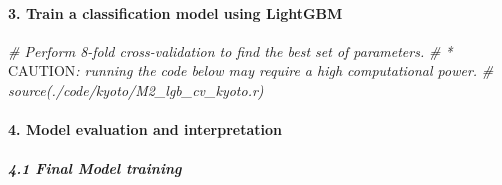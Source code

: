 \documentclass[
]{article}
\newenvironment{Shaded}{\begin{snugshade}}{\end{snugshade}}
\newcommand{\AlertTok}[1]{\textcolor[rgb]{0.94,0.16,0.16}{#1}}
\newcommand{\CommentTok}[1]{\textcolor[rgb]{0.56,0.35,0.01}{\textit{#1}}}
\begin{document}
\hypertarget{train-a-classification-model-using-lightgbm}{%
\paragraph{3. Train a classification model using
LightGBM}\label{train-a-classification-model-using-lightgbm}}

\begin{Shaded}
\begin{Highlighting}[]
\CommentTok{\# Perform 8{-}fold cross{-}validation to find the best set of parameters.}
\CommentTok{\# * }\AlertTok{CAUTION}\CommentTok{: running the code below may require a high computational power.}
\CommentTok{\# source(./code/kyoto/M2\_lgb\_cv\_kyoto.r)}
\end{Highlighting}
\end{Shaded}

\hypertarget{model-evaluation-and-interpretation}{%
\paragraph{4. Model evaluation and
interpretation}\label{model-evaluation-and-interpretation}}

\hypertarget{final-model-training}{%
\subparagraph{4.1 Final Model training}\label{final-model-training}}
\end{document}
